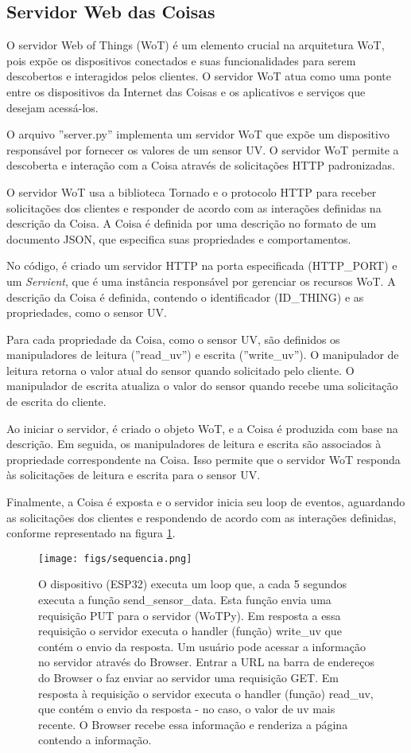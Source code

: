 \subsection{Servidor Web das Coisas}

O servidor Web of Things (WoT) é um elemento crucial na arquitetura WoT, pois expõe os dispositivos conectados e suas funcionalidades para serem descobertos e interagidos pelos clientes. O servidor WoT atua como uma ponte entre os dispositivos da Internet das Coisas e os aplicativos e serviços que desejam acessá-los.

O arquivo ''server.py'' implementa um servidor WoT que expõe um dispositivo responsável por fornecer os valores de um sensor UV. O servidor WoT permite a descoberta e interação com a Coisa através de solicitações HTTP padronizadas.

O servidor WoT usa a biblioteca Tornado e o protocolo HTTP para receber solicitações dos clientes e responder de acordo com as interações definidas na descrição da Coisa. A Coisa é definida por uma descrição no formato de um documento JSON, que especifica suas propriedades e comportamentos.

No código, é criado um servidor HTTP na porta especificada (HTTP\_PORT) e um \textit{Servient}, que é uma instância responsável por gerenciar os recursos WoT. A descrição da Coisa é definida, contendo o identificador (ID\_THING) e as propriedades, como o sensor UV.

Para cada propriedade da Coisa, como o sensor UV, são definidos os manipuladores de leitura (''read\_uv'') e escrita (''write\_uv''). O manipulador de leitura retorna o valor atual do sensor quando solicitado pelo cliente. O manipulador de escrita atualiza o valor do sensor quando recebe uma solicitação de escrita do cliente.

Ao iniciar o servidor, é criado o objeto WoT, e a Coisa é produzida com base na descrição. Em seguida, os manipuladores de leitura e escrita são associados à propriedade correspondente na Coisa. Isso permite que o servidor WoT responda às solicitações de leitura e escrita para o sensor UV.

Finalmente, a Coisa é exposta e o servidor inicia seu loop de eventos, aguardando as solicitações dos clientes e respondendo de acordo com as interações definidas, conforme representado na figura \ref{fig:sequencia}.

\begin{figure}
    \centering
    \texttt{[image: figs/sequencia.png]}
    \caption{O dispositivo (ESP32) executa um loop que, a cada 5 segundos executa a função send\_sensor\_data. Esta função envia uma requisição PUT para o servidor (WoTPy). Em resposta a essa requisição o servidor executa o handler (função) write\_uv que contém o envio da resposta. Um usuário pode acessar a informação no servidor através do Browser. Entrar a URL na barra de endereços do Browser o faz enviar ao servidor uma requisição GET. Em resposta à requisição o servidor executa o handler (função) read\_uv, que contém o envio da resposta - no caso, o valor de uv mais recente. O Browser recebe essa informação e renderiza a página contendo a informação.}
    \label{fig:sequencia}
\end{figure}

